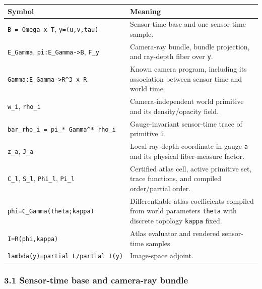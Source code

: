 \documentclass[
]{article}
\newcounter{none} %
\begin{document}
{\def\LTcaptype{none} %
\begin{longtable}[]{@{}
  >{\raggedright\arraybackslash}p{}
  >{\raggedright\arraybackslash}p{}@{}}
\toprule\noalign{}
\begin{minipage}[b]{\linewidth}\raggedright
Symbol
\end{minipage} & \begin{minipage}[b]{\linewidth}\raggedright
Meaning
\end{minipage} \\
\midrule\noalign{}
\endhead
\bottomrule\noalign{}
\endlastfoot
\texttt{B\ =\ Omega\ x\ T}, \texttt{y=(u,v,tau)} & Sensor-time base and
one sensor-time sample. \\
\texttt{E\_Gamma}, \texttt{pi:E\_Gamma-\textgreater{}B}, \texttt{F\_y} &
Camera-ray bundle, bundle projection, and ray-depth fiber over
\texttt{y}. \\
\texttt{Gamma:E\_Gamma-\textgreater{}R\^{}3\ x\ R} & Known camera
program, including its association between sensor time and world
time. \\
\texttt{w\_i}, \texttt{rho\_i} & Camera-independent world primitive and
its density/opacity field. \\
\texttt{bar\_rho\_i\ =\ pi\_*\ Gamma\^{}*\ rho\_i} & Gauge-invariant
sensor-time trace of primitive \texttt{i}. \\
\texttt{z\_a}, \texttt{J\_a} & Local ray-depth coordinate in gauge
\texttt{a} and its physical fiber-measure factor. \\
\texttt{C\_l}, \texttt{S\_l}, \texttt{Phi\_l}, \texttt{Pi\_l} &
Certified atlas cell, active primitive set, trace functions, and
compiled order/partial order. \\
\texttt{phi=C\_Gamma(theta;kappa)} & Differentiable atlas coefficients
compiled from world parameters \texttt{theta} with discrete topology
\texttt{kappa} fixed. \\
\texttt{I=R(phi,kappa)} & Atlas evaluator and rendered sensor-time
samples. \\
\texttt{lambda(y)=partial\ L/partial\ I(y)} & Image-space adjoint. \\
\end{longtable}
}

\subsubsection{3.1 Sensor-time base and camera-ray
bundle}\label{sensor-time-base-and-camera-ray-bundle}
\end{document}
